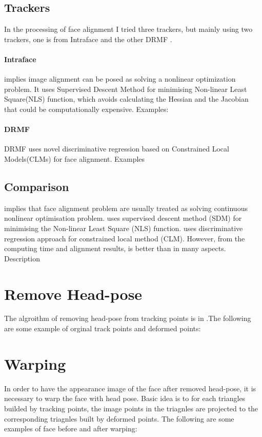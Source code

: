 \subsection{Trackers}
In the processing of face alignment I tried three trackers, but mainly using two trackers, one is from Intraface \cite{xiong2013supervised} and the other DRMF \cite{asthana2013robust}. 
\paragraph{Intraface}
\cite{xiong2013supervised} implies image alignment  can be posed as solving a nonlinear optimization problem. It uses Supervised Descent Method for minimising Non-linear Least Square(NLS) function, which avoids calculating the Hessian and the Jacobian that could be computationally expensive.
\newline
Examples:
\paragraph{DRMF}
DRMF uses novel discriminative regression based on Constrained Local Models(CLMs) for face alignment.
\newline
Examples
\subsection{Comparison}
\cite{xiong2013supervised} implies that face alignment problem are usually treated as  solving continuous nonlinear optimisation problem. \cite{xiong2013supervised} uses supervised descent method (SDM) for minimising the  Non-linear Least Square (NLS) function. \cite{asthana2013robust} uses discriminative regression approach for constrained local method (CLM). However, from the computing time and alignment results, \cite{xiong2013supervised} is better than \cite{asthana2013robust} in many aspects.
\newline
Description
\section{Remove Head-pose}
The algroithm of removing head-pose from tracking points is in \cite{saragih2011deformable}.The following are some example of orginal track points and deformed points:
\section{Warping}
In order to have the appearance image of the face after removed head-pose, it is necessary to warp the face with head pose. Basic idea is to for each triangles builded by tracking points, the image points in the triagnles are projected to the corresponding triagnles built by deformed points. The following are some examples of face before and after warping:
